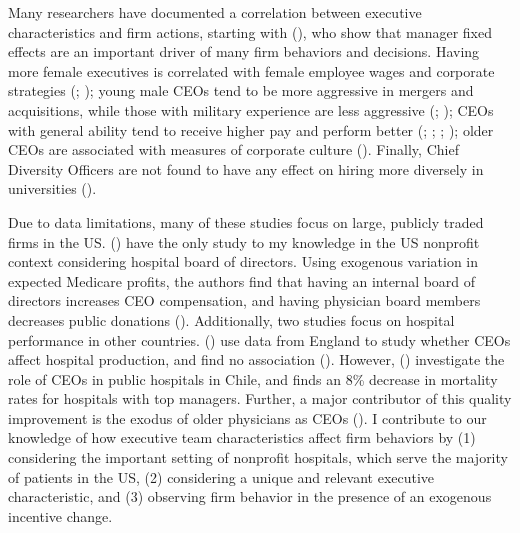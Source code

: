 \documentclass[12pt]{article}
\begin{document}
    Many researchers have documented a correlation between executive characteristics and firm actions, starting with \citeauthor{bertrand2003managing} (\citeyear{bertrand2003managing}), who show that manager fixed effects are an important driver of many firm behaviors and decisions. Having more female executives is correlated with female employee wages and corporate strategies (\cite{flabbi2019female}; \cite{matsa2013female}); young male CEOs tend to be more aggressive in mergers and acquisitions, while those with military experience are less aggressive (\cite{levi2010deal}; \cite{benmelech2015military}); CEOs with general ability tend to receive higher pay and perform better (\cite{kaplan2012ceo}; \cite{custodio2013generalists}; \cite{adams2018director}; \cite{frydman2019rising}); older CEOs are associated with measures of corporate culture (\cite{graham2022corporate}). Finally, Chief Diversity Officers are not found to have any effect on hiring more diversely in universities (\cite{bradley2022impact}). 
    
    Due to data limitations, many of these studies focus on large, publicly traded firms in the US. \citeauthor{brickley2010board} (\citeyear{brickley2010board}) have the only study to my knowledge in the US nonprofit context considering hospital board of directors. Using exogenous variation in expected Medicare profits, the authors find that having an internal board of directors increases CEO compensation, and having physician board members decreases public donations (\cite{brickley2010board}). Additionally, two studies focus on hospital performance in other countries. \citeauthor{janke2019impact} (\citeyear{janke2019impact}) use data from England to study whether CEOs affect hospital production, and find no association (\cite{janke2019impact}). However, \citeauthor{otero2022managers} (\citeyear{otero2022managers}) investigate the role of CEOs in public hospitals in Chile, and finds an 8\% decrease in mortality rates for hospitals with top managers. Further, a major contributor of this quality improvement is the exodus of older physicians as CEOs (\cite{otero2022managers}). I contribute to our knowledge of how executive team characteristics affect firm behaviors by (1) considering the important setting of nonprofit hospitals, which serve the majority of patients in the US, (2) considering a unique and relevant executive characteristic, and (3) observing firm behavior in the presence of an exogenous incentive change. 
\end{document}

